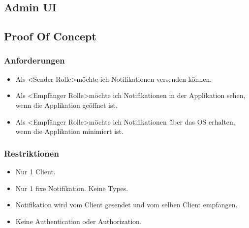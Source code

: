 \clearpage



\subsection{Admin UI}\label{subsec:admin-ui}

\clearpage

\subsection{Proof Of Concept}\label{subsec:proof-of-concept}
\subsubsection*{Anforderungen}
\begin{itemize}
    \item Als \textless Sender Rolle\textgreater möchte ich Notifikationen versenden können.
    \item Als \textless Empfänger Rolle\textgreater möchte ich Notifikationen in der Applikation sehen, wenn die Applikation geöffnet ist.
    \item Als \textless Empfänger Rolle\textgreater möchte ich Notifikationen über das OS erhalten, wenn die Applikation minimiert ist.
\end{itemize}
\subsubsection*{Restriktionen}
\begin{itemize}
    \item Nur 1 Client.
    \item Nur 1 fixe Notifikation. Keine Types.
    \item Notifikation wird vom Client gesendet und vom selben Client empfangen.
    \item Keine Authentication oder Authorization.
\end{itemize}
